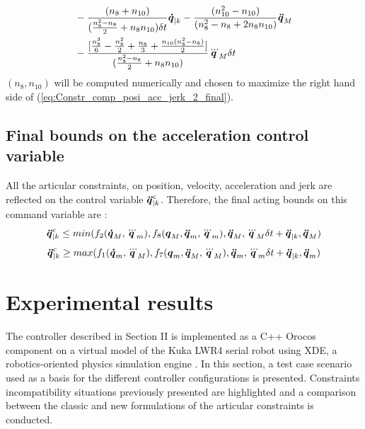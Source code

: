 \documentclass[a4paper, 10pt, conference]{ieeeconf}      %
\newcommand{\vect}[1]{\mbox{\boldmath${#1}$}}%
\begin{document}
{{\begin{equation}
\begin{split}
                     & - \frac{(n_8+n_{10})}{(\frac{n_8^2 - n_8}{2} + n_8 n_{10}) \delta t} \vect{\dot{q}}_{|k} - \frac{(n_{10}^2-n_{10})}{(n_8^2 - n_8 + 2 n_8 n_{10})}  \vect{\ddot{q}}_M \\
                     & -\frac{[\frac{n_8^3}{6} - \frac{n_8^2}{2} + \frac{n_8}{3} + \frac{n_{10}(n_8^2-n_8)}{2}]}{(\frac{n_8^2 - n_8}{2} + n_8 n_{10})} \vect{\dddot{q}}_M \delta t 
\label{eq:Constr_comp_posi_acc_jerk_2_final}
\end{split}
\end{equation}
$(n_8, n_{10})$ will be computed numerically and chosen to maximize the right hand side of (\ref{eq:Constr_comp_posi_acc_jerk_2_final}).

\subsection{Final bounds on the acceleration control variable}
All the articular constraints, on position, velocity, acceleration and jerk are reflected on the control variable $\vect{\ddot{q}}_{|k}^{c}$. Therefore, the final acting bounds on this command variable are :
\begin{equation}
\vect{\ddot{q}}_{|k}^{c} \leq min(f_2(\vect{\dot{q}}_M, \vect{\dddot{q}}_m),  f_8(\vect{q}_M, \vect{\ddot{q}}_m, \vect{\dddot{q}}_m), \vect{\ddot{q}}_M, \vect{\dddot{q}}_{M} \delta t+\vect{\ddot{q}}_{|k}, \vect{\ddot{q}}_{M})
\label{eq:qddot_FINAL_CONSTR_1_final}
\end{equation}
\begin{equation}
\vect{\ddot{q}}_{|k}^{c} \geq max(f_1(\vect{\dot{q}}_m, \vect{\dddot{q}}_M),  f_7(\vect{q}_m, \vect{\ddot{q}}_M, \vect{\dddot{q}}_M), \vect{\ddot{q}}_m, \vect{\dddot{q}}_{m} \delta t+\vect{\ddot{q}}_{|k}, \vect{\ddot{q}}_{m})
\label{eq:qddot_FINAL_CONSTR_2_final}
\end{equation}












\section{Experimental results}
The controller described in Section II is implemented as a C++ Orocos component \cite{rtt-url} on a virtual model of the Kuka LWR4 serial robot using XDE, a robotics-oriented physics simulation engine \cite{merlhiot2012}. In this section, a test case scenario used as a basis for the different controller configurations is presented. Constraints incompatibility situations previously presented are highlighted and a comparison between the classic and new formulations of the articular constraints is conducted. 

}}
\end{document}
